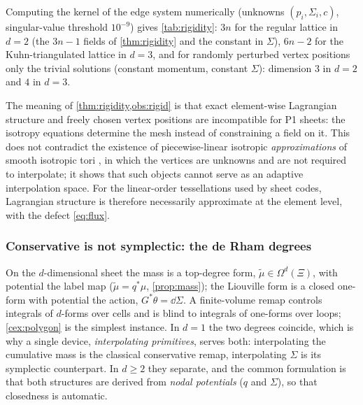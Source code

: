 \begin{observation}\label{obs:rigid}
Computing the kernel of the edge system numerically (unknowns $(p_i,\Sigma_i,c)$, singular-value threshold
$10^{-9}$) gives \cref{tab:rigidity}: $3n$ for the regular lattice in $d=2$ (the $3n-1$ fields of
\cref{thm:rigidity} and the constant in $\Sigma$), $6n-2$ for the Kuhn-triangulated lattice in $d=3$, and for
randomly perturbed vertex positions only the trivial solutions (constant momentum, constant $\Sigma$): dimension
$3$ in $d=2$ and $4$ in $d=3$.
\end{observation}

\begin{table}[t]\centering\small
\TableRigidity
\caption{Dimension of the space of exactly isotropic P1 sheets over a fixed vertex set
(\texttt{verify\_propositions.py}). ``Generic'' positions: lattice points displaced by independent uniform
perturbations of $\pm0.15$ lattice spacings.}\label{tab:rigidity}
\end{table}

The meaning of \cref{thm:rigidity,obs:rigid} is that exact element-wise Lagrangian structure and freely chosen
vertex positions are incompatible for P1 sheets: the isotropy equations determine the mesh instead of
constraining a field on it. This does not contradict the existence of piecewise-linear isotropic
\emph{approximations} of smooth isotropic tori \cite{JRT2019}, in which the vertices are unknowns and are not
required to interpolate; it shows that such objects cannot serve as an adaptive interpolation space. For the
linear-order tessellations used by sheet codes, Lagrangian structure is therefore necessarily approximate at the
element level, with the defect \eqref{eq:flux}.

\subsubsection*{Conservative is not symplectic: the de Rham degrees}\label{sec:derham}
On the $d$-dimensional sheet the mass is a top-degree form, $\tilde\mu\in\Omega^d(\Xi)$, with potential the label
map ($\tilde\mu=q^*\mu$, \cref{prop:mass}); the Liouville form is a closed one-form with potential the action,
$G^*\theta=\dd\Sigma$. A finite-volume remap controls integrals of $d$-forms over cells and is blind to integrals
of one-forms over loops; \cref{cex:polygon} is the simplest instance. In $d=1$ the two degrees coincide, which is
why a single device, \emph{interpolating primitives}, serves both: interpolating the cumulative mass is the
classical conservative remap, interpolating $\Sigma$ is its symplectic counterpart. In $d\ge2$ they separate, and
the common formulation is that both structures are derived from \emph{nodal potentials} ($q$ and $\Sigma$), so that
closedness is automatic.

